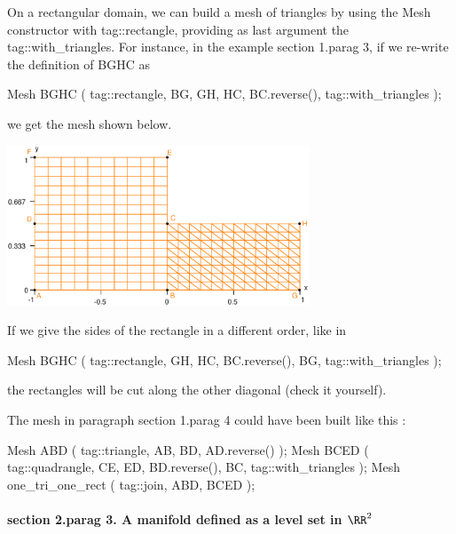 On a rectangular domain, we can build a mesh of triangles by using the {\codett Mesh} constructor
with {\codett tag::rectangle}, providing as last argument the {\codett tag::with\_triangles}.
For instance, in the example \numb section 1.\numb parag 3, if we re-write the definition of
{\codett BGHC} as

\verbatim
   Mesh BGHC ( tag::rectangle, BG, GH, HC, BC.reverse(), tag::with_triangles );
\endverbatim

\noindent we get the mesh shown below.

{ 
\centerline{\includegraphics[width=90mm]{L-shaped-tri.eps}} }

If we give the sides of the rectangle in a different order, like in

\verbatim
   Mesh BGHC ( tag::rectangle, GH, HC, BC.reverse(), BG, tag::with_triangles );
\endverbatim

\noindent the rectangles will be cut along the other diagonal (check it yourself).

The mesh in paragraph \numb section 1.\numb parag 4 could have been built like this :

\verbatim
   Mesh ABD ( tag::triangle, AB, BD, AD.reverse() );
   Mesh BCED ( tag::quadrangle, CE, ED, BD.reverse(), BC, tag::with_triangles );
   Mesh one_tri_one_rect ( tag::join, ABD, BCED );
\endverbatim


\paragraph{\numb section 2.\numb parag 3. A manifold defined as a level set in $ \RR^2 $}

